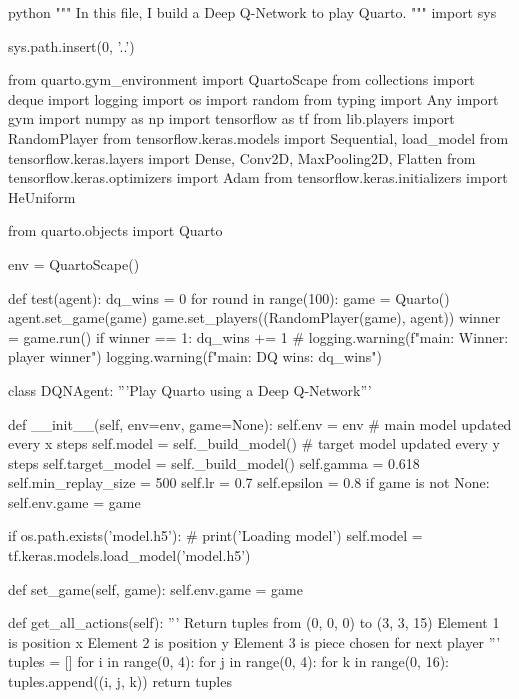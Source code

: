 \begin{mintedbox}{python}
"""
In this file, I build a Deep Q-Network to play Quarto.
"""
import sys

sys.path.insert(0, '..')

from quarto.gym_environment import QuartoScape
from collections import deque
import logging
import os
import random
from typing import Any
import gym
import numpy as np
import tensorflow as tf
from lib.players import RandomPlayer
from tensorflow.keras.models import Sequential, load_model
from tensorflow.keras.layers import Dense, Conv2D, MaxPooling2D, Flatten
from tensorflow.keras.optimizers import Adam
from tensorflow.keras.initializers import HeUniform

from quarto.objects import Quarto

env = QuartoScape()


def test(agent):
    dq_wins = 0
    for round in range(100):
        game = Quarto()
        agent.set_game(game)
        game.set_players((RandomPlayer(game), agent))
        winner = game.run()
        if winner == 1:
            dq_wins += 1
        # logging.warning(f"main: Winner: player {winner}")
    logging.warning(f"main: DQ wins: {dq_wins}")


class DQNAgent:
    '''Play Quarto using a Deep Q-Network'''

    def __init__(self, env=env, game=None):
        self.env = env
        # main model updated every x steps
        self.model = self._build_model()
        # target model updated every y steps
        self.target_model = self._build_model()
        self.gamma = 0.618
        self.min_replay_size = 500
        self.lr = 0.7
        self.epsilon = 0.8
        if game is not None:
            self.env.game = game

        if os.path.exists('model.h5'):
            # print('Loading model')
            self.model = tf.keras.models.load_model('model.h5')

    def set_game(self, game):
        self.env.game = game

    def get_all_actions(self):
        '''
        Return tuples from (0, 0, 0) to (3, 3, 15)
        Element 1 is position x
        Element 2 is position y
        Element 3 is piece chosen for next player
        '''
        tuples = []
        for i in range(0, 4):
            for j in range(0, 4):
                for k in range(0, 16):
                    tuples.append((i, j, k))
        return tuples


\end{mintedbox}
